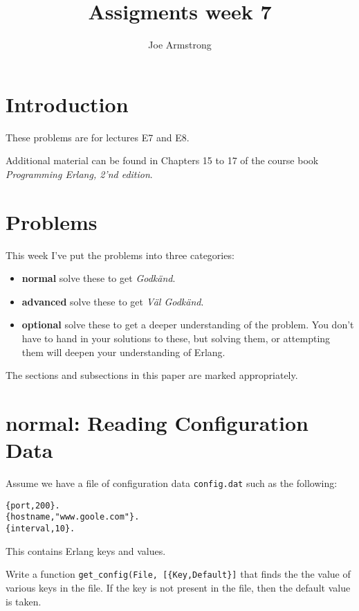 \documentclass[12pt]{hitec}
\title{Assigments week 7}
\author{Joe Armstrong}
\begin{document}
\maketitle

\tableofcontents

\section{Introduction}
These problems are for lectures E7 and E8.

Additional material can be found in Chapters 15 to 17 of the course book
{\sl Programming Erlang, 2'nd edition}.

\section{Problems}

This week I've put the problems into three categories:

\begin{itemize}
\item {\bf normal} solve these to get {\sl Godk\"{a}nd}.
\item {\bf advanced} solve these to get {\sl V\"{a}l Godk\"{a}nd}.
\item {\bf optional} solve these to get a deeper understanding of the problem. You don't
have to hand in your solutions to these, but solving them, or attempting them will
deepen your understanding of Erlang.
\end{itemize}

The sections and subsections in this paper are marked appropriately.

\section{normal: Reading Configuration Data}

Assume we have a file of configuration data \verb+config.dat+ such as the following:

\begin{Verbatim}[frame=single]
{port,200}.
{hostname,"www.goole.com"}.
{interval,10}.
\end{Verbatim}

This contains Erlang keys and values.

Write a function \verb+get_config(File, [{Key,Default}]+ that finds the
the value of various keys in the file. If the key is not present in the file,
then the default value is taken.
\end{document}
